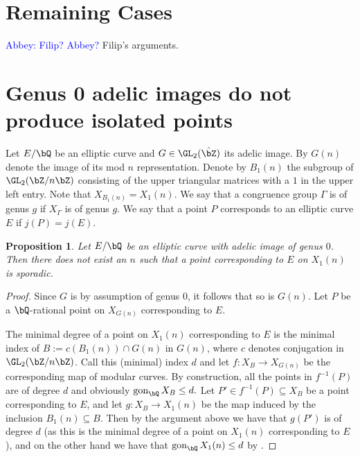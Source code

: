 \documentclass[11pt,reqno]{amsart}
\theoremstyle{plain}
\newtheorem{proposition}[theorem]{Proposition}
\theoremstyle{definition}
\DeclareMathOperator{\gon}{gon}
\newcommand{\Q}{\bQ}
\newcommand{\Z}{\bZ}
\newcommand{\abbey}[1]{\textcolor{blue}{Abbey: #1}}
\begin{document}
\section{Remaining Cases}
\abbey{Filip? Abbey?}
Filip's arguments.



\section{Genus 0 adelic images do not produce isolated points}

Let $E/ \Q$ be an elliptic curve and $G\in \GL_2(\hat \Z)$ its adelic image. By $G(n)$ denote the image of its mod $n$ representation. Denote by $B_1(n)$ the subgroup of $\GL_2(\Z/n\Z)$ consisting of the upper triangular matrices with a $1$ in the upper left entry. Note that $X_{B_1(n)}=X_1(n)$. We say that a congruence group $\Gamma$ is of genus $g$ if $X_\Gamma$ is of genus $g$. We say that a point $P$ corresponds to an elliptic curve $E$ if $j(P)=j(E)$.

\begin{proposition}
Let $E/\Q$ be an elliptic curve with adelic image of genus $0$. Then there does not exist an $n$ such that a point corresponding to $E$ on $X_1(n)$ is sporadic.
\end{proposition}
\begin{proof}
Since $G$ is by assumption of genus $0$, it follows that so is $G(n)$. Let $P$ be a $\Q$-rational point on $X_{G(n)}$ corresponding to $E$. 


The minimal degree of a point on $X_1(n)$ corresponding to $E$ is the minimal index of $B:=c(B_1(n))\cap G(n)$ in $G(n)$, where $c$ denotes conjugation in $\GL_2(\Z /n \Z)$. 
Call this (minimal) index $d$ and let $f:X_{B}\rightarrow X_{G(n)}$ be the corresponding map of modular curves. By construction, all the points in $f^{-1}(P)$ are of degree $d$ and obviously $\gon_\Q X_{B}\leq d.$ Let $P'\in f^{-1}(P) \subseteq X_{B}$ be a point corresponding to $E$, and let $g:X_{B}\rightarrow X_1(n)$ be the map induced by the inclusion $B_1(n) \subseteq B$. Then by the argument above we have that $g(P')$ is of degree $d$ (as this is the minimal degree of a point on $X_1(n)$ corresponding to $E$), and on the other hand we have that $\gon_\Q X_1(n)\leq d$ by \cite[Proposition A.1 (vii)]{Poonen:gonality}.
\end{proof}




\vspace{20 mm}


\end{document}
